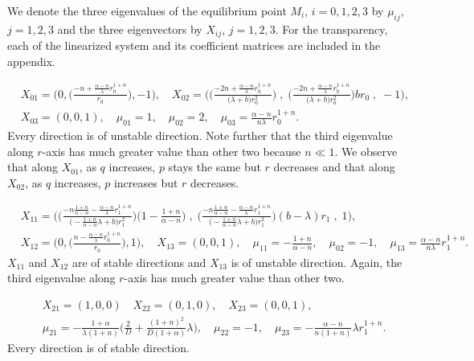 \documentclass[a4paper,11pt]{article}
\begin{document}
We denote the three eigenvalues of the equilibrium point $M_i$, $i=0,1,2,3$ by $\mu_{ij}$, $j=1,2,3$ and the three eigenvectors by $X_{ij}$, $j=1,2,3$. For the transparency, each of the linearized system and its coefficient matrices are included in the appendix. \medskip

\begin{align*}
&X_{01} = \bigg(0, \Big(\frac{-n+ \frac{\alpha-n}{\lambda}r_0^{1+n}}{r_0}\Big), -1\bigg), \quad
 X_{02} = \bigg( \Big( \frac{-2n + \frac{\alpha-n}{\lambda}r_0^{1+n}}{\big({\lambda}+b\big) r_0^2}\Big) \;,\;\Big( \frac{-2n + \frac{\alpha-n}{\lambda}r_0^{1+n}}{\big({\lambda}+b\big) r_0^2}\Big)br_0\;,\;-1\bigg),\\
 &X_{03} = (0,0,1), \quad \mu_{01} = 1, \quad \mu_{02}= 2, \quad \mu_{03} = \frac{\alpha-n}{n\lambda}r_0^{1+n}.
\end{align*}
Every direction is of unstable direction. Note further that the third eigenvalue along $r$-axis has much greater value than other two because $n \ll 1$. We observe that along $X_{01}$, as $q$ increases, $p$ stays the same but $r$ decreases and that along $X_{02}$, as $q$ increases, $p$ increases but $r$ decreases. 
\medskip

\begin{align*}
&X_{11} = \bigg(  \Big(\frac{-n\frac{1+n}{\alpha-n} - \frac{\alpha-n}{\lambda}r_1^{1+n}}{\big(-\frac{1+n}{\alpha-n} \lambda +b\big) r_1^2}\Big)\Big(1-\frac{1+n}{\alpha-n}\Big) \;,\;\Big(\frac{-n\frac{1+n}{\alpha-n} - \frac{\alpha-n}{\lambda}r_1^{1+n}}{\big(-\frac{1+n}{\alpha-n} \lambda +b\big) r_1^2}\Big)(b-\lambda)r_1\;,\;1\bigg),\\ 
 &X_{12} = \bigg(0, \Big(\frac{n- \frac{\alpha-n}{\lambda}r_0^{1+n}}{r_0}\Big), 1\bigg), \quad
 X_{13} = (0,0,1), \quad \mu_{11} =-\frac{1+n}{\alpha-n}, \quad \mu_{02}=-1, \quad \mu_{13} = \frac{\alpha-n}{n\lambda}r_1^{1+n}.
\end{align*}
$X_{11}$ and $X_{12}$ are of stable directions and $X_{13}$ is of unstable direction. Again, the third eigenvalue along $r$-axis has much greater value than other two.
\medskip

\begin{align*}
 &X_{21} = (1,0,0) \quad X_{22}=(0,1,0), \quad X_{23}=(0,0,1),\\
 &\mu_{21} =-\frac{1+\alpha}{\lambda(1+n)} \Big(\frac{2}{D} + \frac{(1+n)^2}{D(1+\alpha)}\lambda\Big), \quad \mu_{22}=-1, \quad \mu_{23} = -\frac{\alpha-n}{n(1+n)}\lambda r_1^{1+n}.
\end{align*}
Every direction is of stable direction.
\medskip
\end{document}
